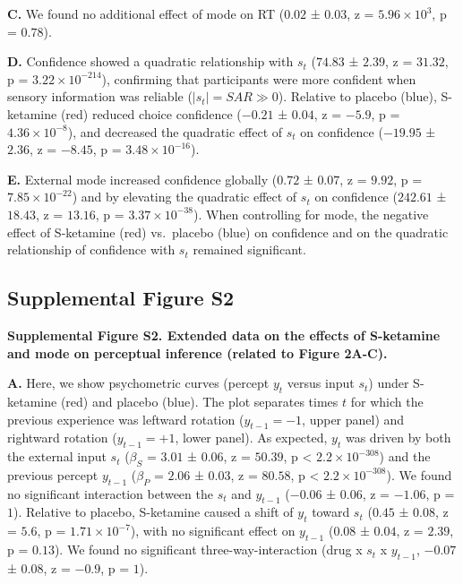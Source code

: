 \documentclass[
]{article}
\begin{document}
\textbf{C.} We found no additional effect of mode on RT (\(0.02\) ±
\(0.03\), z = \(\ensuremath{5.96\times 10^{3}}\), p = \(0.78\)).

\textbf{D.} Confidence showed a quadratic relationship with \(s_t\)
(\(74.83\) ± \(2.39\), z = \(31.32\), p =
\(\ensuremath{3.22\times 10^{-214}}\)), confirming that participants
were more confident when sensory information was reliable
(\(|s_t| = SAR \gg 0\)). Relative to placebo (blue), S-ketamine (red)
reduced choice confidence (\(-0.21\) ± \(0.04\), z = \(-5.9\), p =
\(\ensuremath{4.36\times 10^{-8}}\)), and decreased the quadratic effect
of \(s_t\) on confidence (\(-19.95\) ± \(2.36\), z = \(-8.45\), p =
\(\ensuremath{3.48\times 10^{-16}}\)).

\textbf{E.} External mode increased confidence globally (\(0.72\) ±
\(0.07\), z = \(9.92\), p = \(\ensuremath{7.85\times 10^{-22}}\)) and by
elevating the quadratic effect of \(s_t\) on confidence (\(242.61\) ±
\(18.43\), z = \(13.16\), p = \(\ensuremath{3.37\times 10^{-38}}\)).
When controlling for mode, the negative effect of S-ketamine (red)
vs.~placebo (blue) on confidence and on the quadratic relationship of
confidence with \(s_t\) remained significant.

\newpage

\hypertarget{supplemental-figure-s2}{%
\subsection{Supplemental Figure S2}\label{supplemental-figure-s2}}


\textbf{Supplemental Figure S2. Extended data on the effects of
S-ketamine and mode on perceptual inference (related to Figure 2A-C).}

\textbf{A.} Here, we show psychometric curves (percept \(y_t\) versus
input \(s_t\)) under S-ketamine (red) and placebo (blue). The plot
separates times \(t\) for which the previous experience was leftward
rotation (\(y_{t-1} = -1\), upper panel) and rightward rotation
(\(y_{t-1} = +1\), lower panel). As expected, \(y_t\) was driven by both
the external input \(s_t\) (\(\beta_S\) = \(3.01\) ± \(0.06\), z =
\(50.39\), p < \(\ensuremath{2.2\times 10^{-308}}\)) and the previous percept \(y_{t-1}\)
(\(\beta_{P}\) = \(2.06\) ± \(0.03\), z = \(80.58\), p < \(\ensuremath{2.2\times 10^{-308}}\)). We
found no significant interaction between the \(s_t\) and \(y_{t-1}\)
(\(-0.06\) ± \(0.06\), z = \(-1.06\), p = \(1\)). Relative to placebo,
S-ketamine caused a shift of \(y_t\) toward \(s_t\) (\(0.45\) ±
\(0.08\), z = \(5.6\), p = \(\ensuremath{1.71\times 10^{-7}}\)), with no
significant effect on \(y_{t-1}\) (\(0.08\) ± \(0.04\), z = \(2.39\), p
= \(0.13\)). We found no significant three-way-interaction (drug x
\(s_t\) x \(y_{t-1}\), \(-0.07\) ± \(0.08\), z = \(-0.9\), p = \(1\)).
\end{document}
